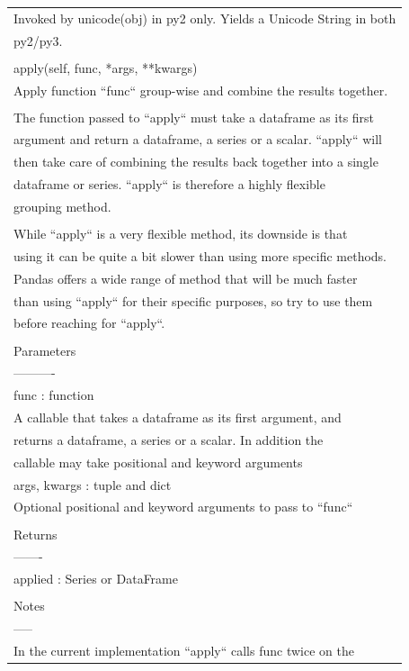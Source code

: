 \documentclass[11pt]{article}
\begin{document}
\begin{enumerate}
\begin{enumerate}
\begin{enumerate}
\begin{center}
\begin{tabular}{l}
\\
Invoked by unicode(obj) in py2 only. Yields a Unicode String in both\\
py2/py3.\\
\\
apply(self, func, *args, **kwargs)\\
Apply function ``func``  group-wise and combine the results together.\\
\\
The function passed to ``apply`` must take a dataframe as its first\\
argument and return a dataframe, a series or a scalar. ``apply`` will\\
then take care of combining the results back together into a single\\
dataframe or series. ``apply`` is therefore a highly flexible\\
grouping method.\\
\\
While ``apply`` is a very flexible method, its downside is that\\
using it can be quite a bit slower than using more specific methods.\\
Pandas offers a wide range of method that will be much faster\\
than using ``apply`` for their specific purposes, so try to use them\\
before reaching for ``apply``.\\
\\
Parameters\\
----------\\
func : function\\
A callable that takes a dataframe as its first argument, and\\
returns a dataframe, a series or a scalar. In addition the\\
callable may take positional and keyword arguments\\
args, kwargs : tuple and dict\\
Optional positional and keyword arguments to pass to ``func``\\
\\
Returns\\
-------\\
applied : Series or DataFrame\\
\\
Notes\\
-----\\
In the current implementation ``apply`` calls func twice on the\\

\end{tabular}
\end{center}
\end{enumerate}
\end{enumerate}
\end{enumerate}
\end{document}
